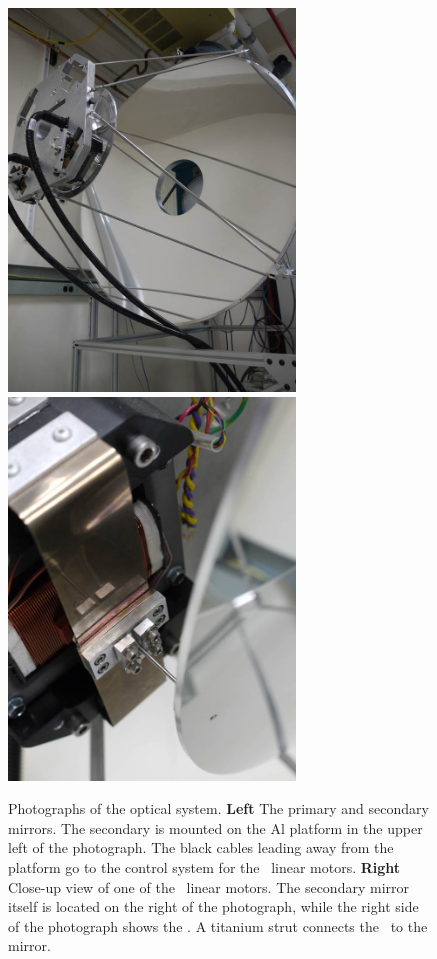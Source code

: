 \begin{figure}
\centering
\includegraphics[width=3in]{images/optics.jpg}
\includegraphics[width=3in]{images/optics-bose.jpg}
\caption[Photographs of the optical system]{
  Photographs of the optical system.
  \textbf{Left} The primary and secondary mirrors.
  The secondary is mounted on the Al platform in the upper left of the photograph.
  The black cables leading away from the platform go to the control system for the \BOSE\ linear motors.
  \textbf{Right} Close-up view of one of the \BOSE\ linear motors.
  The secondary mirror itself is located on the right of the photograph, while the right side of the photograph shows the \BOSE.
  A titanium strut connects the \BOSE\ to the mirror.
}
\label{fig:ch4-optics}
\end{figure}

